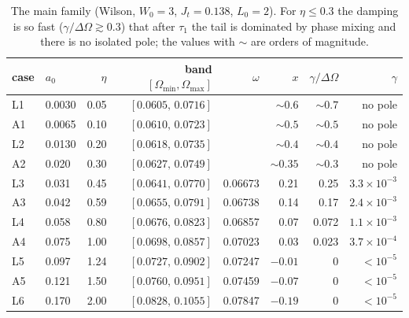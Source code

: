\documentclass[11pt,a4paper]{article}
\begin{document}
\begin{table}[!htbp]
\centering
\small
\begin{tabular}{llrrrrrr}
\toprule
case & $a_0$ & $\eta$ & band $[\Omega_{\min},\Omega_{\max}]$ & $\omega$ & $x$ & $\gamma/\Delta\Omega$ & $\gamma$\\
\midrule
L1 & 0.0030 & 0.05 & $[0.0605,\,0.0716]$ & & $\sim0.6$ & $\sim0.7$ & no pole\\
A1 & 0.0065 & 0.10 & $[0.0610,\,0.0723]$ & & $\sim0.5$ & $\sim0.5$ & no pole\\
L2 & 0.0130 & 0.20 & $[0.0618,\,0.0735]$ & & $\sim0.4$ & $\sim0.4$ & no pole\\
A2 & 0.020 & 0.30 & $[0.0627,\,0.0749]$ & & $\sim0.35$ & $\sim0.3$ & no pole\\
L3 & 0.031 & 0.45 & $[0.0641,\,0.0770]$ & 0.06673 & 0.21 & 0.25 & $3.3\times10^{-3}$\\
A3 & 0.042 & 0.59 & $[0.0655,\,0.0791]$ & 0.06738 & 0.14 & 0.17 & $2.4\times10^{-3}$\\
L4 & 0.058 & 0.80 & $[0.0676,\,0.0823]$ & 0.06857 & 0.07 & 0.072 & $1.1\times10^{-3}$\\
A4 & 0.075 & 1.00 & $[0.0698,\,0.0857]$ & 0.07023 & 0.03 & 0.023 & $3.7\times10^{-4}$\\
L5 & 0.097 & 1.24 & $[0.0727,\,0.0902]$ & 0.07247 & $-0.01$ & 0 & $<10^{-5}$\\
A5 & 0.121 & 1.50 & $[0.0760,\,0.0951]$ & 0.07459 & $-0.07$ & 0 & $<10^{-5}$\\
L6 & 0.170 & 2.00 & $[0.0828,\,0.1055]$ & 0.07847 & $-0.19$ & 0 & $<10^{-5}$\\
\bottomrule
\end{tabular}
\caption{The main family (Wilson, $W_0=3$, $J_t=0.138$, $L_0=2$). For $\eta\le0.3$ the damping is
so fast ($\gamma/\Delta\Omega\gtrsim0.3$) that after $\tau_1$ the tail is dominated by phase mixing and
there is no isolated pole; the values with $\sim$ are orders of magnitude.}
\label{tab:barrido_eta}
\end{table}
\end{document}
